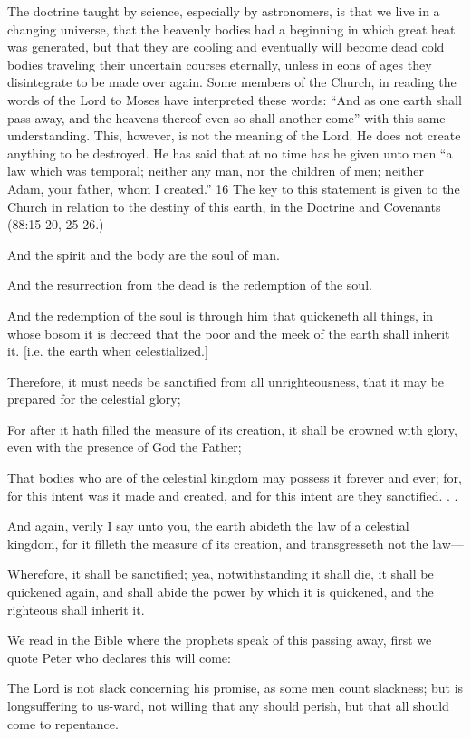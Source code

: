 The doctrine taught by science, especially by astronomers, is that we live in a changing
universe, that the heavenly bodies had a beginning in which great heat was generated, but
that they are cooling and eventually will become dead cold bodies traveling their uncertain
courses eternally, unless in eons of ages they disintegrate to be made over again. Some
members of the Church, in reading the words of the Lord to Moses have interpreted these
words: ``And as one earth shall pass away, and the heavens thereof even so shall another
come'' with this same understanding. This, however, is not the meaning of the Lord. He does
not create anything to be destroyed. He has said that at no time has he given unto men ``a law
which was temporal; neither any man, nor the children of men; neither Adam, your father,
whom I created.'' 16 The key to this statement is given to the Church in relation to the destiny
of this earth, in the Doctrine and Covenants (88:15-20, 25-26.)

And the spirit and the body are the soul of man.

And the resurrection from the dead is the redemption of the soul.

And the redemption of the soul is through him that quickeneth all things, in whose bosom it
is decreed that the poor and the meek of the earth shall inherit it. [i.e. the earth when
celestialized.]

Therefore, it must needs be sanctified from all unrighteousness, that it may be prepared for
the celestial glory;

For after it hath filled the measure of its creation, it shall be crowned with glory, even with
the presence of God the Father;

That bodies who are of the celestial kingdom may possess it forever and ever; for, for this
intent was it made and created, and for this intent are they sanctified. . .

And again, verily I say unto you, the earth abideth the law of a celestial kingdom, for it filleth
the measure of its creation, and transgresseth not the law—

Wherefore, it shall be sanctified; yea, notwithstanding it shall die, it shall be quickened again,
and shall abide the power by which it is quickened, and the righteous shall inherit it.

We read in the Bible where the prophets speak of this passing away, first we quote Peter who
declares this will come:

The Lord is not slack concerning his promise, as some men count slackness; but is
longsuffering to us-ward, not willing that any should perish, but that all should come to
repentance.

